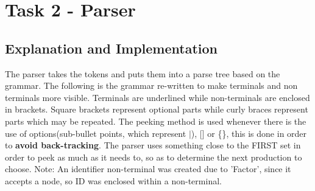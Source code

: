 \section{Task 2 - Parser}
\subsection{Explanation and Implementation}

The parser takes the tokens and puts them into a parse tree based on the grammar. The following is the grammar re-written to make terminals and non terminals more visible. Terminals are underlined while non-terminals are enclosed in brackets. Square brackets represent optional parts while curly braces represent parts which may be repeated. The peeking method is used whenever there is the use of options(sub-bullet points, which represent $|$), [] or \{\}, this is done in order to \textbf{avoid back-tracking}. The parser uses something close to the FIRST set in order to peek as much as it needs to, so as to determine the next production to choose. Note: An identifier non-terminal was created due to 'Factor', since it accepts a node, so ID was enclosed within a non-terminal.

